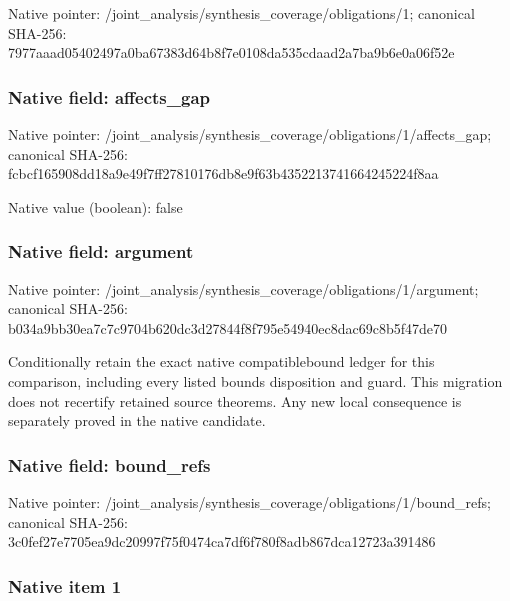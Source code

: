 \documentclass[10pt,a4paper]{article}
\begin{document}
Native pointer: /joint\_analysis/synthesi\allowbreak{}s\_coverage/obligations/1; canonical SHA-256: 7977aaad05402497a0ba6738\allowbreak{}3d64b8f7e0108da535cdaad2\allowbreak{}a7ba9b6e0a06f52e



\subsubsection{Native field: affects\_gap}


Native pointer: /joint\_analysis/synthesi\allowbreak{}s\_coverage/obligations/1\allowbreak{}/affects\_gap; canonical SHA-256: fcbcf165908dd18a9e49f7ff\allowbreak{}27810176db8e9f63b4352213\allowbreak{}741664245224f8aa



Native value (boolean): false



\subsubsection{Native field: argument}


Native pointer: /joint\_analysis/synthesi\allowbreak{}s\_coverage/obligations/1\allowbreak{}/argument; canonical SHA-256: b034a9bb30ea7c7c9704b620\allowbreak{}dc3d27844f8f795e54940ec8\allowbreak{}dac69c8b5f47de70


Conditionally retain the exact native compatiblebound ledger for this comparison, including every listed bounds disposition and guard. This migration does not recertify retained source theorems. Any new local consequence is separately proved in the native candidate.


\subsubsection{Native field: bound\_refs}


Native pointer: /joint\_analysis/synthesi\allowbreak{}s\_coverage/obligations/1\allowbreak{}/bound\_refs; canonical SHA-256: 3c0fef27e7705ea9dc20997f\allowbreak{}75f0474ca7df6f780f8adb86\allowbreak{}7dca12723a391486



\subsubsection{Native item 1}
\end{document}
